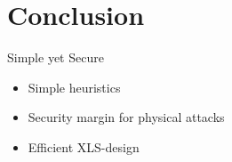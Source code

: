 \section{Conclusion}

\begin{frame}{Simple yet Secure}
\begin{itemize}
    \item Simple heuristics
    \item Security margin for physical attacks
    \item Efficient XLS-design 
\end{itemize}
\end{frame}

